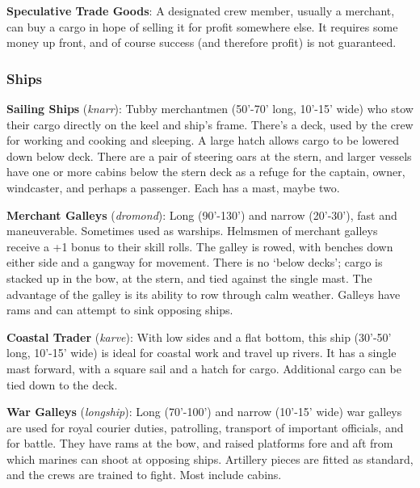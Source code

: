 \documentclass{book}
\begin{document}
\textbf{Speculative Trade Goods}: A designated crew member, usually a
merchant, can buy a cargo in hope of selling it for profit somewhere
else. It requires some money up front, and of course success (and
therefore profit) is not guaranteed.

\subsubsection*{Ships}\label{ships}

\textbf{Sailing Ships} (\emph{knarr}): Tubby merchantmen (50'-70' long,
10'-15' wide) who stow their cargo directly on the keel and ship's
frame. There's a deck, used by the crew for working and cooking and
sleeping. A large hatch allows cargo to be lowered down below deck.
There are a pair of steering oars at the stern, and larger vessels have
one or more cabins below the stern deck as a refuge for the captain,
owner, windcaster, and perhaps a passenger. Each has a mast, maybe two.

\textbf{Merchant Galleys} (\emph{dromond}): Long (90'-130') and narrow
(20'-30'), fast and maneuverable. Sometimes used as warships. Helmsmen
of merchant galleys receive a +1 bonus to their skill rolls. The galley
is rowed, with benches down either side and a gangway for movement.
There is no `below decks'; cargo is stacked up in the bow, at the stern,
and tied against the single mast. The advantage of the galley is its
ability to row through calm weather. Galleys have rams and can attempt
to sink opposing ships.

\textbf{Coastal Trader} (\emph{karve}): With low sides and a flat
bottom, this ship (30'-50' long, 10'-15' wide) is ideal for coastal work
and travel up rivers. It has a single mast forward, with a square sail
and a hatch for cargo. Additional cargo can be tied down to the deck.

\textbf{War Galleys} (\emph{longship}): Long (70'-100') and narrow
(10'-15' wide) war galleys are used for royal courier duties,
patrolling, transport of important officials, and for battle. They have
rams at the bow, and raised platforms fore and aft from which marines
can shoot at opposing ships. Artillery pieces are fitted as standard,
and the crews are trained to fight. Most include cabins.
\end{document}
